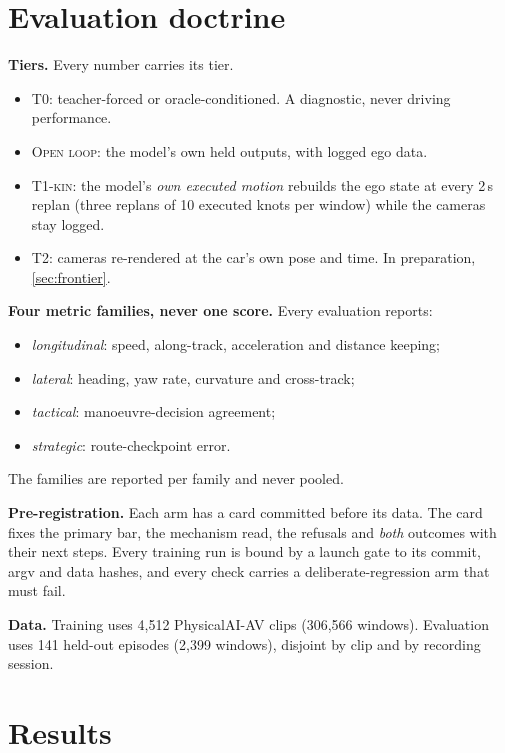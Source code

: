 \documentclass[10pt,twocolumn]{article}
\theoremstyle{remark}
\newcommand{\tier}[1]{\textsc{\small #1}}
\begin{document}
\section{Evaluation doctrine}\label{sec:eval}
\textbf{Tiers.} Every number carries its tier.
\begin{itemize}
  \item \tier{T0}: teacher-forced or oracle-conditioned. A diagnostic, never driving performance.
  \item \tier{Open loop}: the model's own held outputs, with logged ego data.
  \item \tier{T1-kin}: the model's \emph{own executed motion} rebuilds the ego state at every 2\,s replan (three replans of 10 executed
        knots per window) while the cameras stay logged.
  \item \tier{T2}: cameras re-rendered at the car's own pose and time. In preparation, \cref{sec:frontier}.
\end{itemize}

\textbf{Four metric families, never one score.} Every evaluation reports:
\begin{itemize}
  \item \emph{longitudinal}: speed, along-track, acceleration and distance keeping;
  \item \emph{lateral}: heading, yaw rate, curvature and cross-track;
  \item \emph{tactical}: manoeuvre-decision agreement;
  \item \emph{strategic}: route-checkpoint error.
\end{itemize}
The families are reported per family and never pooled.

\textbf{Pre-registration.} Each arm has a card committed before its data. The card fixes the primary bar, the mechanism read, the
refusals and \emph{both} outcomes with their next steps. Every training run is bound by a launch gate to its commit, argv and data
hashes, and every check carries a deliberate-regression arm that must fail.

\textbf{Data.} Training uses 4,512 PhysicalAI-AV clips (306,566 windows). Evaluation uses 141 held-out episodes (2,399 windows),
disjoint by clip and by recording session.

\section{Results}\label{sec:results}
\end{document}
